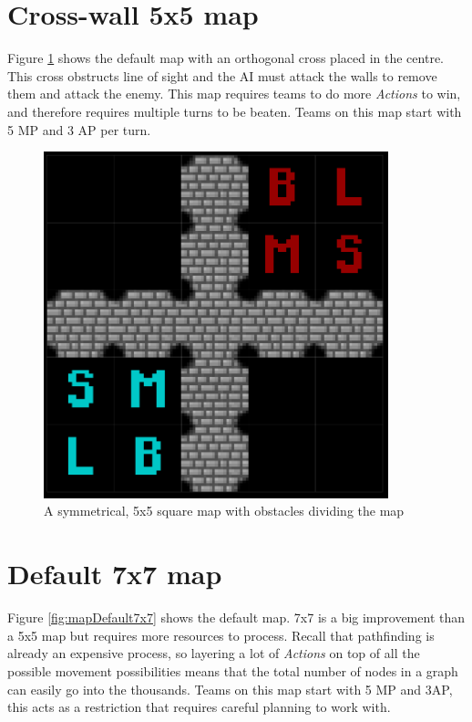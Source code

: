 \documentclass[11pt, a4paper]{report}
\begin{document}
\begin{appendices}
\section{Cross-wall 5x5 map}
\label{sec:mapCrossWall5x5}

Figure \ref{fig:mapWithCrossWalls5x5} shows the default map with an orthogonal cross placed in the centre. This cross obstructs line of sight and the AI must attack the walls to remove them and attack the enemy. This map requires teams to do more \emph{Actions} to win, and therefore requires multiple turns to be beaten. Teams on this map start with 5 MP and 3 AP per turn.

\begin{figure}[!h]
  \centering
  \includegraphics[width=10cm]{img/map_cross_wall_5x5.png}
  \caption{A symmetrical, 5x5 square map with obstacles dividing the map}
  \label{fig:mapWithCrossWalls5x5}
\end{figure}

\section{Default 7x7 map}
\label{sec:mapDefault7x7}

Figure \ref{fig:mapDefault7x7} shows the default map. 7x7 is a big improvement than a 5x5 map but requires more resources to process. Recall that pathfinding is already an expensive process, so layering a lot of \emph{Actions} on top of all the possible movement possibilities means that the total number of nodes in a graph can easily go into the thousands. Teams on this map start with 5 MP and 3AP, this acts as a restriction that requires careful planning to work with.


\end{appendices}
\end{document}

